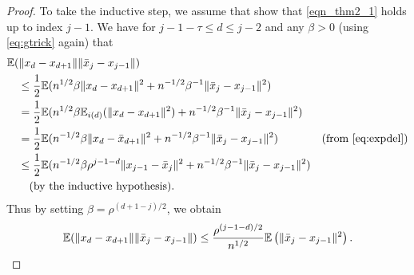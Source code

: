 \documentclass{siamltex}
\newcounter{ass_counter}
\begin{document}
\begin{proof}
To take the inductive step, we assume that show that
\eqref{eqn_thm2_1} holds up to index $j-1$. We have for $j-1-\tau \leq
d \leq j-2$ and any $\beta>0$ (using \eqref{eq:gtrick} again) that
\begin{alignat*}{2}
\nonumber
&{\mathbb{E}} (\|x_{d}-x_{d+1}\| \|\bar{x}_j -x_{j-1}\|) && \\
\nonumber
&\quad \leq {1\over 2}{\mathbb{E}} (n^{1/2}\beta\|x_{d}-x_{d+1}\|^2 + n^{-1/2}\beta^{-1}\|\bar{x}_j -x_{j-1}\|^2) && \\
\nonumber
&\quad = {1\over 2} {\mathbb{E}} (n^{1/2}\beta{\mathbb{E}}_{i(d)}(\|x_{d}-{x}_{d+1}\|^2) + n^{-1/2}\beta^{-1}\|\bar{x}_j -x_{j-1}\|^2) && \\
\nonumber
&\quad = {1\over 2} {\mathbb{E}} (n^{-1/2}\beta\|x_{d}-\bar{x}_{d+1}\|^2 + n^{-1/2}\beta^{-1}\|\bar{x}_j -x_{j-1}\|^2) \quad && (\text{from \eqref{eq:expdel}})\\
\nonumber
&\quad \leq {1\over 2} {\mathbb{E}} (n^{-1/2}\beta\rho^{j-1-d}\|x_{j-1}-\bar{x}_{j}\|^2 + n^{-1/2}\beta^{-1}\|\bar{x}_j -x_{j-1}\|^2) 
\\ \nonumber
&\quad \quad
(\text{by the inductive hypothesis}).
\end{alignat*}
Thus by setting $\beta=\rho^{(d+1-j)/2}$, we obtain
\begin{align}
{\mathbb{E}} (\|x_{d}-x_{d+1}\| \|\bar{x}_j -x_{j-1}\|)
 \leq {\rho^{(j-1-d)/2}\over n^{1/2}} {\mathbb{E}} \left(\|\bar{x}_j -x_{j-1}\|^2\right).
\label{eqn_proof2_3}
\end{align}


\end{proof}
\end{document}
